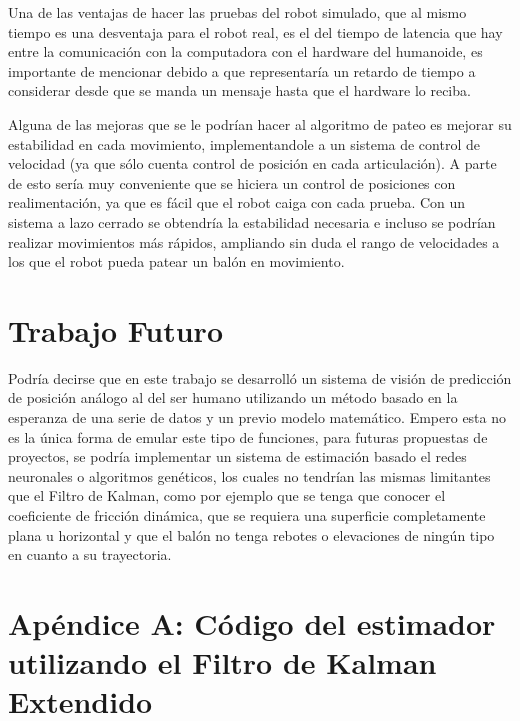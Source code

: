 	Una de las ventajas de hacer las pruebas del robot simulado, que al mismo tiempo es una desventaja para el robot real, es el del tiempo de latencia que hay entre la comunicación con la computadora con el hardware del humanoide, es importante de mencionar debido a que representaría un retardo de tiempo a considerar desde que se manda un mensaje hasta que el hardware lo reciba. 
	
	Alguna de las mejoras que se le podrían hacer al algoritmo de pateo es mejorar su estabilidad en cada movimiento, implementandole a un sistema de control de velocidad (ya que sólo cuenta control de posición en cada articulación). A parte de esto sería muy conveniente que se hiciera un control de posiciones con realimentación, ya que es fácil que el robot caiga con cada prueba. Con un sistema a lazo cerrado se obtendría la estabilidad necesaria e incluso se podrían realizar movimientos más rápidos, ampliando sin duda el rango de velocidades a los que el robot pueda patear un balón en movimiento. 
	
\section{Trabajo Futuro}
	Podría decirse que en este trabajo se desarrolló un sistema de visión de predicción de posición análogo al del ser humano utilizando un método basado en la esperanza de una serie de datos y un previo modelo matemático. Empero esta no es la única forma de emular este tipo de funciones, para futuras propuestas de proyectos, se podría implementar un sistema de estimación basado el redes neuronales o algoritmos genéticos, los cuales no tendrían las mismas limitantes que el Filtro de Kalman, como por ejemplo que se tenga que conocer el coeficiente de fricción dinámica, que se requiera una superficie completamente plana u horizontal y que el balón no tenga rebotes o elevaciones de ningún tipo en cuanto a su trayectoria.

\appendix
\section{Apéndice A: Código del estimador utilizando el Filtro de Kalman Extendido}
